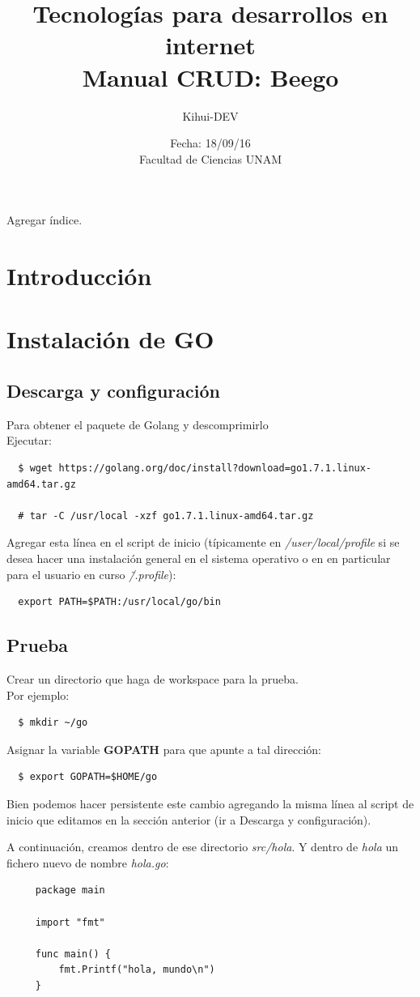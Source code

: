 \documentclass[12pt]{article}
\title{Tecnologías para desarrollos en internet \\ Manual CRUD: Beego}
\author{Kihui-DEV}
\date{Fecha: 18/09/16 \\ Facultad de Ciencias UNAM}
\begin{document}
\maketitle
Agregar índice.
\section*{Introducción}
\section*{Instalación de GO}
\subsection*{Descarga y configuración}
Para obtener el paquete de Golang y descomprimirlo \\
Ejecutar:
\begin{verbatim}
  $ wget https://golang.org/doc/install?download=go1.7.1.linux-amd64.tar.gz

  # tar -C /usr/local -xzf go1.7.1.linux-amd64.tar.gz
\end{verbatim}


Agregar esta línea en el script de inicio (típicamente en \textit{/user/local/profile}
si se desea hacer una instalación general en el sistema operativo o
en en particular para el usuario en curso \textit{\~/.profile}):
\begin{verbatim}
  export PATH=$PATH:/usr/local/go/bin
\end{verbatim}

\subsection*{Prueba}
Crear un directorio que haga de workspace para la prueba.\\
Por ejemplo:
\begin{verbatim}
  $ mkdir ~/go
\end{verbatim}
Asignar la variable \textbf{GOPATH} para que apunte a tal dirección:
\begin{verbatim}
  $ export GOPATH=$HOME/go
\end{verbatim}
Bien podemos hacer persistente este cambio agregando la misma línea al script
de inicio que editamos en la sección anterior (ir a Descarga y configuración). \par

A continuación, creamos dentro de ese directorio  \textit{src/hola}.
Y dentro de \textit{hola\/} un fichero nuevo de nombre \textit{hola.go}:
\begin{verbatim}
     package main

     import "fmt"

     func main() {
         fmt.Printf("hola, mundo\n")
     }
\end{verbatim}
\end{document}
